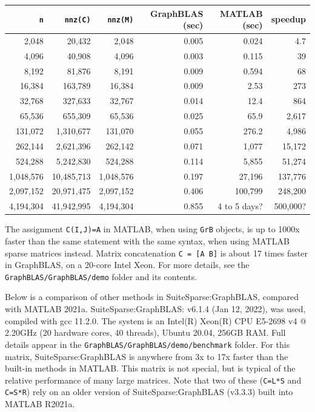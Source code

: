\vspace{0.10in}
{\scriptsize
\begin{tabular}{rrr|rrr}
\hline
\verb'n'    & \verb'nnz(C)' & \verb'nnz(M)' & GraphBLAS (sec) & MATLAB (sec) & speedup \\
\hline
2,048        & 20,432         & 2,048          & 0.005     & 0.024     & 4.7 \\
4,096        & 40,908         & 4,096          & 0.003     & 0.115     & 39 \\
8,192        & 81,876         & 8,191          & 0.009     & 0.594     & 68 \\
16,384       & 163,789        & 16,384         & 0.009     & 2.53      & 273 \\
32,768       & 327,633        & 32,767         & 0.014     & 12.4      & 864 \\
65,536       & 655,309        & 65,536         & 0.025     & 65.9      & 2,617 \\
131,072      & 1,310,677      & 131,070        & 0.055     & 276.2     & 4,986 \\
262,144      & 2,621,396      & 262,142        & 0.071     & 1,077     & 15,172 \\
524,288      & 5,242,830      & 524,288        & 0.114     & 5,855     & 51,274 \\
1,048,576    & 10,485,713     & 1,048,576      & 0.197     & 27,196    & 137,776 \\
2,097,152    & 20,971,475     & 2,097,152      & 0.406     & 100,799   & 248,200 \\
4,194,304    & 41,942,995     & 4,194,304      & 0.855  & 4 to 5 days? & 500,000?\\
\hline
\end{tabular}}
\vspace{0.10in}

The assignment \verb'C(I,J)=A' in MATLAB, when using \verb'GrB' objects, is up
to 1000x faster than the same statement with the same syntax, when using MATLAB
sparse matrices instead.  Matrix concatenation \verb'C = [A B]' is about 17
times faster in GraphBLAS, on a 20-core Intel Xeon.  For more details, see the
\verb'GraphBLAS/GraphBLAS/demo' folder and its contents.

Below is a comparison of other methods in SuiteSparse:GraphBLAS, compared with
MATLAB 2021a.  SuiteSparse:GraphBLAS: v6.1.4 (Jan 12, 2022), was used, compiled
with gcc 11.2.0.  The system is an Intel(R) Xeon(R) CPU E5-2698 v4 @ 2.20GHz
(20 hardware cores, 40 threads), Ubuntu 20.04, 256GB RAM.  Full details appear
in the \verb'GraphBLAS/GraphBLAS/demo/benchmark' folder.  For this matrix,
SuiteSparse:GraphBLAS is anywhere from 3x to 17x faster than the built-in
methods in MATLAB.  This matrix is not special, but is typical of the relative
performance of many large matrices.  Note that two of these (\verb'C=L*S' and
\verb'C=S*R') rely on an older version of SuiteSparse:GraphBLAS (v3.3.3) built
into MATLAB R2021a.

